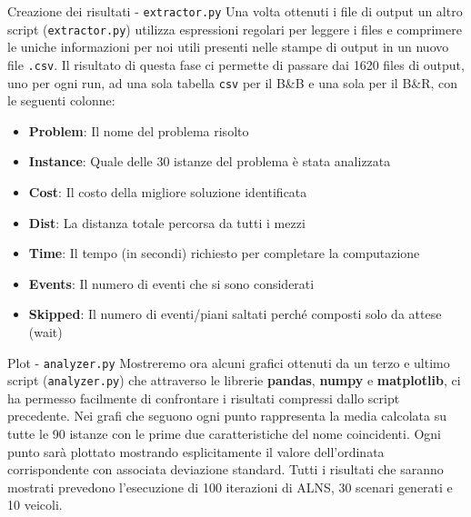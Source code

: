 \documentclass[10pt]{beamer}
\begin{document}
    \begin{frame}{Creazione dei risultati - \texttt{extractor.py}}
        Una volta ottenuti i file di output un altro script (\texttt{extractor.py}) utilizza espressioni regolari per leggere i files e comprimere le uniche informazioni per noi utili presenti nelle stampe di output in un nuovo file \texttt{.csv}. Il risultato di questa fase ci permette di passare dai 1620 files di output, uno per ogni run, ad una sola tabella \texttt{csv} per il B\&B e una sola per il B\&R, con le seguenti colonne: 
        \begin{itemize}
            \item \textbf{Problem}: Il nome del problema risolto
            \item \textbf{Instance}: Quale delle 30 istanze del problema è stata analizzata
            \item \textbf{Cost}: Il costo della migliore soluzione identificata
            \item\textbf{Dist}: La distanza totale percorsa da tutti i mezzi
            \item\textbf{Time}: Il tempo (in secondi) richiesto per completare la computazione
            \item \textbf{Events}: Il numero di eventi che si sono considerati
            \item \textbf{Skipped}: Il numero di eventi/piani saltati perché composti solo da attese (wait)
        \end{itemize}
    \end{frame} 

    \begin{frame}{Plot - \texttt{analyzer.py}}
        Mostreremo ora alcuni grafici ottenuti da un terzo e ultimo script (\texttt{analyzer.py}) che attraverso le librerie \textbf{pandas}, \textbf{numpy} e \textbf{matplotlib}, ci ha permesso facilmente di confrontare i risultati compressi dallo script precedente.
        Nei grafi che seguono ogni punto rappresenta la media calcolata su tutte le 90 istanze con le prime due caratteristiche del nome coincidenti. Ogni punto sarà plottato mostrando esplicitamente il valore dell'ordinata corrispondente con associata deviazione standard.
        \newline
        \newline
         Tutti i risultati che saranno mostrati prevedono l'esecuzione di 100 iterazioni di ALNS, 30 scenari generati e 10 veicoli.
        
    \end{frame}
\end{document}

